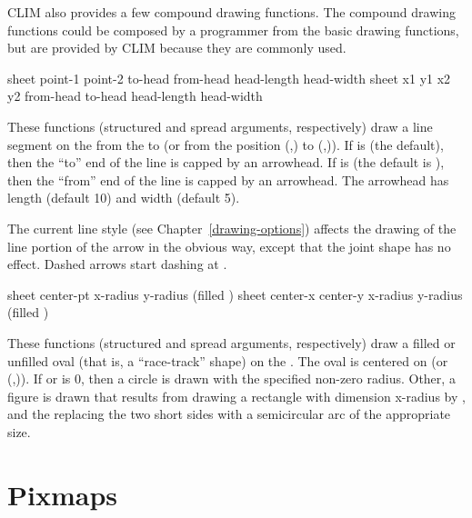 CLIM also provides a few compound drawing functions.  The compound drawing
functions could be composed by a programmer from the basic drawing functions,
but are provided by CLIM because they are commonly used.

  {sheet point-1 point-2 \key \DrawingOptions \LineCapOptions
                                                 to-head from-head
                                                 head-length head-width}
 {sheet x1 y1 x2 y2 \key \DrawingOptions \LineCapOptions
                                             from-head to-head
                                             head-length head-width}

These functions (structured and spread arguments, respectively) draw a line
segment on the   from the   to
 (or from the position (,) to (,)).
If  is  (the default), then the ``to'' end of the line
is capped by an arrowhead.  If  is  (the default is
), then the ``from'' end of the line is capped by an arrowhead.  The
arrowhead has length  (default 10) and width 
(default 5).

The current line style (see Chapter~\ref{drawing-options}) affects the drawing
of the line portion of the arrow in the obvious way, except that the joint shape
has no effect.  Dashed arrows start dashing at .


  {sheet center-pt x-radius y-radius \key (filled ) 
                                                       \DrawingOptions \LineCapOptions}
 {sheet center-x center-y x-radius y-radius \key (filled )
                                                               \DrawingOptions \LineCapOptions}

These functions (structured and spread arguments, respectively) draw a filled or
unfilled oval (that is, a ``race-track'' shape) on the  .
The oval is centered on  (or (,)).
If  or  is $0$, then a circle is drawn with the
specified non-zero radius.  Other, a figure is drawn that results from drawing a
rectangle with dimension {x-radius} by , and the replacing the two
short sides with a semicircular arc of the appropriate size.


\section {Pixmaps}

